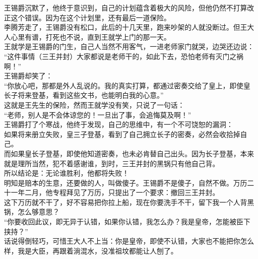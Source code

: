 \begin{multicols}{\theparacolNo}
王锡爵沉默了，他终于意识到，自己的计划蕴含着极大的风险，但他仍然不打算改正这个错误。因为在这个计划里，还有最后一道保险。\\

李腾芳走了，王锡爵没有松口，此后的十几天里，跑来吵架的人就没断过。但王大人心里有谱，打死也不说，直到王就学上门的那一天。\\

王就学是王锡爵的门生，自己人当然不用客气，一进老师家门就哭，边哭还边说：\\

“这件事情（三王并封）大家都说是老师干的，如此下去，恐怕老师有灭门之祸啊！”\\

王锡爵却笑了：\\

“你放心吧，那都是外人乱说的。我的真实打算，都通过密奏交给了皇上，即使皇长子将来登基，看到这些文书，也能明白我的心意。”\\

这就是王先生的保险，然而王就学没有笑，只说了一句话：\\

“老师，别人是不会体谅您的！一旦出了事，会追悔莫及啊！”\\

王锡爵打了个寒战，他终于发现，自己的思维中，有一个不可饶恕的漏洞：\\

如果将来册立失败，皇三子登基，看到了自己拥立长子的密奏，必然会收拾掉自己。\\

而如果皇长子登基，即使他知道密奏，也未必肯替自己出头。因为长子登基，本来就是理所当然，犯不着感谢谁，到时，三王并封的黑锅只有他自己背。\\

所以结论是：无论谁胜利，他都将失败！\\

明知是赔本的生意，还要做的人，叫做傻子。王锡爵不是傻子，自然不做。万历二十一年二月，他专程拜见了万历，只提出了一个要求：撤回三王并封。\\

这下万历就不干了，好不容易把你拉上船，现在你要洗手不干，留下我一个人背黑锅，怎么够意思？\\

“你要收回此议，即无异于认错，如果你认错，我怎么办？我是皇帝，怎能被臣下挟持？”\\

话说得倒轻巧，可惜王大人不上当：你是皇帝，即使不认错，大家也不能把你怎么样，我是大臣，再跟着淌混水，没准祖坟都能让人刨了。\\


\end{multicols}

